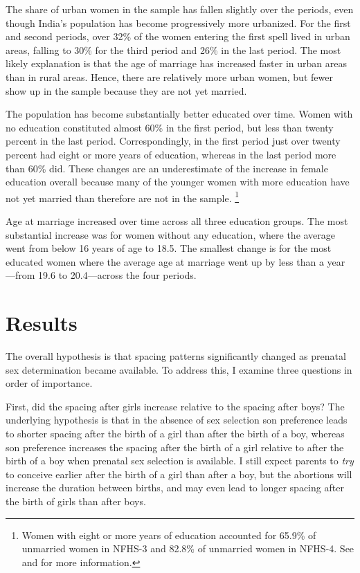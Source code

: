 \documentclass[12pt,letterpaper]{article}
\begin{document}
The share of urban women in the sample has fallen slightly over the
periods, even though India's population has become progressively more urbanized.
For the first and second periods, over 32\% of the women 
entering the first spell lived in urban areas, falling to 
30\% for the third period and 26\% in the last period.
The most likely explanation is that the age of marriage has increased
faster in urban areas than in rural areas.
Hence, there are relatively more urban women, but fewer show up in the
sample because they are not yet married.

The population has become substantially better educated over time.
Women with no education constituted almost 60\% 
in the first period, but less than twenty percent in the last period.
Correspondingly, in the first period just over twenty percent had eight or more 
years of education, whereas in the last period more than 60\% did.
These changes are an underestimate of the increase in female
education overall because many of the younger women with more education
have not yet married than therefore are not in the sample.%
\footnote{
Women with eight or more years of education accounted for 65.9\% of
unmarried women in NFHS-3 and 82.8\% of unmarried women in NFHS-4.
See \citet[p 56]{International-Institute-for-Population-Sciences-IIPS2007}
and \citet[p 61]{International-Institute-for-Population-Sciences-IIPS2017}
for more information.
 }

Age at marriage increased over time across all three education groups.
The most substantial increase was for women without any education, where
the average went from below 16 years of age to 18.5.
The smallest change is for the most educated women where the average age
at marriage went up by less than a year---from 19.6 to 20.4---across the 
four periods.


\section{Results\label{sec:results}}


The overall hypothesis is that spacing patterns significantly changed 
as prenatal sex determination became available.
To address this, I examine three questions in order of importance.

First, did the spacing after girls increase relative to the spacing
after boys?
The underlying hypothesis is that in the absence of sex selection son 
preference leads to shorter spacing after the birth of a girl than after the 
birth of a boy, whereas son preference increases the spacing after the birth 
of a girl relative to after the birth of a boy when prenatal sex selection is 
available.
I still expect parents to \emph{try} to conceive earlier after the birth 
of a girl than after a boy, but the abortions will increase the 
duration between births, and may even lead to longer spacing after the
birth of girls than after boys.
\end{document}
